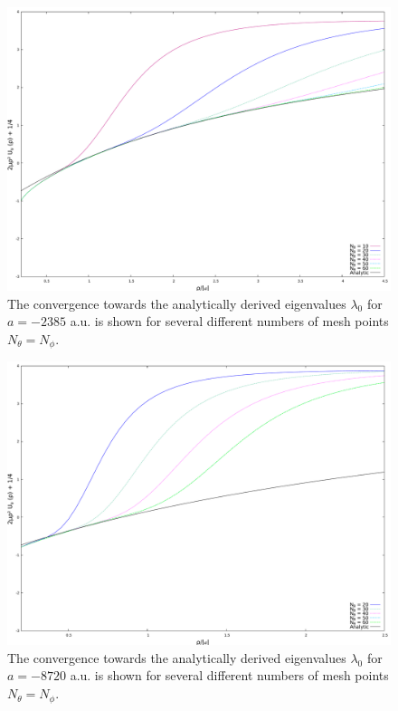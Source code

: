 \begin{figure}
	\includegraphics[width=\linewidth]{sn2385.pdf}
	\caption{The convergence towards the analytically derived eigenvalues $\lambda_0$ for $a=-2385$ a.u. is shown for several different numbers of mesh points $N_{\theta}=N_{\phi}$.}
	\label{fig:res_6}
\end{figure}

\begin{figure}
	\includegraphics[width=\linewidth]{sn8720.pdf}
	\caption{The convergence towards the analytically derived eigenvalues $\lambda_0$ for $a=-8720$ a.u. is shown for several different numbers of mesh points $N_{\theta}=N_{\phi}$.}
	\label{fig:res_7}
\end{figure}

